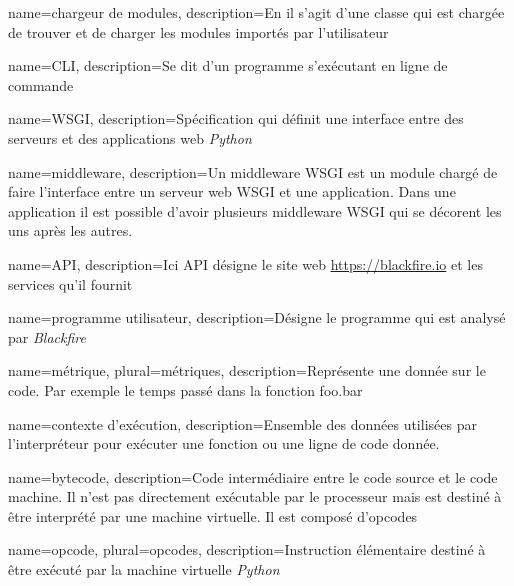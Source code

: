 {
  name=chargeur de modules,
  description={En \Python il s'agit d'une classe qui est chargée de trouver et de charger les modules importés par l'utilisateur}
}

{
  name=CLI,
  description=Se dit d'un programme s'exécutant en ligne de commande
}

{
  name=WSGI,
  description=Spécification qui définit une interface entre des serveurs et des applications web \emph{Python}
}

{
  name=middleware,
  description=Un middleware WSGI est un module \Python chargé de faire l'interface entre un serveur web WSGI et une application. Dans une application il est possible d'avoir plusieurs middleware WSGI qui se décorent les uns après les autres.
}

{
  name=API,
  description=Ici API désigne le site web \url{https://blackfire.io} et les services qu'il fournit
}

{
  name=programme utilisateur,
  description=Désigne le programme qui est analysé par \emph{Blackfire}
}

{
  name=métrique,
  plural=métriques,
  description=Représente une donnée sur le code. Par exemple le temps passé dans la fonction foo.bar
}
 
{
  name=contexte d'exécution,
  description=Ensemble des données utilisées par l'interpréteur \Python pour exécuter une fonction ou une ligne de code donnée.
}
 
{
  name=bytecode,
  description=Code intermédiaire entre le code source et le code machine. Il n'est pas directement exécutable par le processeur mais est destiné à être interprété par une machine virtuelle. Il est composé d'opcodes
}
 
{
  name=opcode,
  plural=opcodes,
  description=Instruction élémentaire destiné à être exécuté par la machine virtuelle \emph{Python}
}